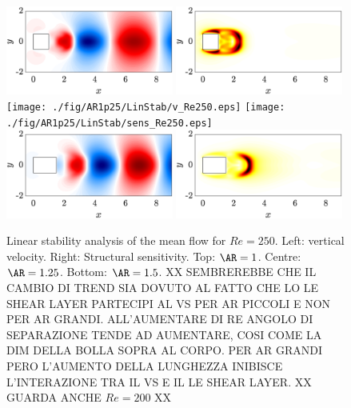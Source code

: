 \begin{figure}
  \centering
  \includegraphics[width=0.49\textwidth]{./fig/AR1/LinStab/v_Re250.eps}
  \includegraphics[width=0.49\textwidth]{./fig/AR1/LinStab/sens_Re250.eps}
  \texttt{[image: ./fig/AR1p25/LinStab/v\_Re250.eps]}
  \texttt{[image: ./fig/AR1p25/LinStab/sens\_Re250.eps]}
  \includegraphics[width=0.49\textwidth]{./fig/AR1p5/LinStab/v_Re250.eps}
  \includegraphics[width=0.49\textwidth]{./fig/AR1p5/LinStab/sens_Re250.eps}
  \caption{Linear stability analysis of the mean flow for $Re=250$. Left: vertical velocity. Right: Structural sensitivity. Top: $\AR=1$. Centre: $\AR=1.25$. Bottom: $\AR=1.5$. XX SEMBREREBBE CHE IL CAMBIO DI TREND SIA DOVUTO AL FATTO CHE LO LE SHEAR LAYER PARTECIPI AL VS PER AR PICCOLI E NON PER AR GRANDI. ALL'AUMENTARE DI RE ANGOLO DI SEPARAZIONE TENDE AD AUMENTARE, COSI COME LA DIM DELLA BOLLA SOPRA AL CORPO. PER AR GRANDI PERO L'AUMENTO DELLA LUNGHEZZA INIBISCE L'INTERAZIONE TRA IL VS E IL LE SHEAR LAYER. XX GUARDA ANCHE $Re=200$ XX}
  \label{fig:MF_stab2}
\end{figure}

